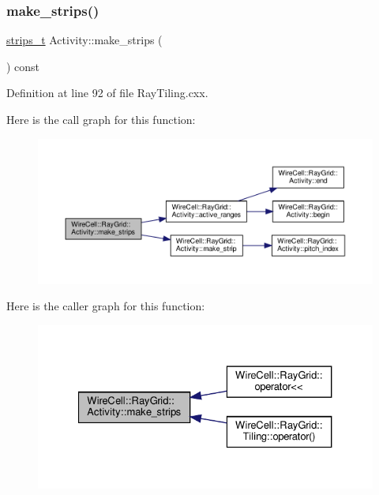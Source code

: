 \subsubsection{\texorpdfstring{make\+\_\+strips()}{make\_strips()}}
{\footnotesize\ttfamily \hyperlink{namespace_wire_cell_1_1_ray_grid_a06c9ce08c0358d22fae3185aff8a9b7c}{strips\+\_\+t} Activity\+::make\+\_\+strips (\begin{DoxyParamCaption}{ }\end{DoxyParamCaption}) const}



Definition at line 92 of file Ray\+Tiling.\+cxx.

Here is the call graph for this function\+:
\nopagebreak
\begin{figure}[H]
\begin{center}
\leavevmode
\includegraphics[width=350pt]{class_wire_cell_1_1_ray_grid_1_1_activity_a4319dbeecdffdfe805f768530e0cbe9f_cgraph}
\end{center}
\end{figure}
Here is the caller graph for this function\+:
\nopagebreak
\begin{figure}[H]
\begin{center}
\leavevmode
\includegraphics[width=327pt]{class_wire_cell_1_1_ray_grid_1_1_activity_a4319dbeecdffdfe805f768530e0cbe9f_icgraph}
\end{center}
\end{figure}
\mbox{\label{class_wire_cell_1_1_ray_grid_1_1_activity_a8c051a729c264f4ca6e91e21e6edf729}} 
